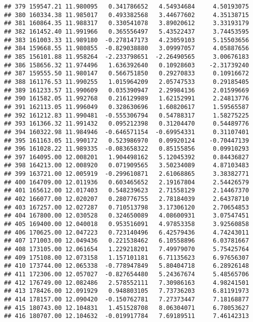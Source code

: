 \documentclass[
]{article}
\begin{document}
\begin{verbatim}
## 379 159547.21 11.980095   0.341786652   4.54934684     4.50193075
## 380 160334.38 11.985017   0.493382568   3.44677602     4.35138715
## 381 160864.35 11.988317   0.330541078   3.89020612     3.33193179
## 382 161452.40 11.991966   0.365556497   5.43522437     3.74453595
## 383 161003.33 11.989180  -0.278147173   4.23059103     5.15503656
## 384 159668.55 11.980855  -0.829038880   3.09997057     4.05887656
## 385 156101.88 11.958264  -2.233798651  -2.26490565     3.00676183
## 386 158656.32 11.974496   1.636392640   0.10928603    -2.31739240
## 387 159555.50 11.980147   0.566751850   0.29270833     0.10916672
## 388 161176.53 11.990255   1.015964209   2.05747533     0.29185405
## 389 161233.57 11.990609   0.035390947   2.29984136     2.01599669
## 390 161582.05 11.992768   0.216129989   1.62152991     2.24813776
## 391 162113.05 11.996049   0.328630696   1.60820617     1.59565587
## 392 161212.83 11.990481  -0.555306794   0.54788317     1.58275225
## 393 161366.32 11.991432   0.095212398   0.31204470     0.54489776
## 394 160322.98 11.984946  -0.646571154  -0.69954331     0.31107401
## 395 161163.05 11.990172   0.523986970   0.09920124    -0.70447139
## 396 161028.22 11.989335  -0.083658322   0.85155856     0.09910293
## 397 164095.00 12.008201   1.904498162   5.12045392     0.84436827
## 398 164213.00 12.008920   0.071909565   3.50234089     4.87103483
## 399 163721.00 12.005919  -0.299610871   2.61068865     3.38382771
## 400 164709.00 12.011936   0.603465652   2.19167804     2.54426579
## 401 165612.00 12.017403   0.548239623   2.71558129     2.14467370
## 402 166077.00 12.020207   0.280776755   2.78184039     2.64378710
## 403 167257.00 12.027287   0.710513798   3.17306120     2.70654853
## 404 167800.00 12.030528   0.324650089   4.08600931     3.07547451
## 405 169400.00 12.040018   0.953516091   4.97853358     3.92560858
## 406 170625.00 12.047223   0.723140496   6.42579436     4.74243011
## 407 171003.00 12.049436   0.221538462   6.10558896     6.03781667
## 408 173105.00 12.061654   1.229218201   7.49979070     5.75425764
## 409 175108.00 12.073158   1.157101181   6.71135623     6.97656307
## 410 173744.00 12.065338  -0.778947849   5.80404718     6.28926148
## 411 172306.00 12.057027  -0.827654480   5.24367674     5.48565706
## 412 176749.00 12.082486   2.578552111   7.30986163     4.98241501
## 413 178426.00 12.091929   0.948803105   7.73736203     6.81191973
## 414 178157.00 12.090420  -0.150762781   7.27373447     7.18168877
## 415 180743.00 12.104831   1.451528708   8.06304071     6.78053627
## 416 180707.00 12.104632  -0.019917784   7.69189511     7.46142313

\end{verbatim}
\end{document}
